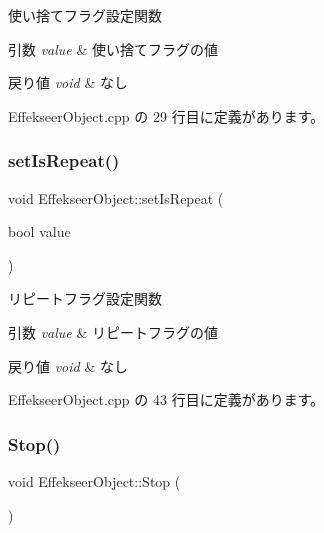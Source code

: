 使い捨てフラグ設定関数 


\begin{DoxyParams}{引数}
{\em value} & 使い捨てフラグの値 \\
\hline
\end{DoxyParams}

\begin{DoxyRetVals}{戻り値}
{\em void} & なし \\
\hline
\end{DoxyRetVals}


 Effekseer\+Object.\+cpp の 29 行目に定義があります。

\mbox{\label{class_effekseer_object_a5a321097534dd21b16862f56f66e730b}} 
\subsubsection{\texorpdfstring{set\+Is\+Repeat()}{setIsRepeat()}}
{\footnotesize\ttfamily void Effekseer\+Object\+::set\+Is\+Repeat (\begin{DoxyParamCaption}\item[{bool}]{value }\end{DoxyParamCaption})}



リピートフラグ設定関数 


\begin{DoxyParams}{引数}
{\em value} & リピートフラグの値 \\
\hline
\end{DoxyParams}

\begin{DoxyRetVals}{戻り値}
{\em void} & なし \\
\hline
\end{DoxyRetVals}


 Effekseer\+Object.\+cpp の 43 行目に定義があります。

\mbox{\label{class_effekseer_object_adfbdfbe202b78441b33d76656453e536}} 
\subsubsection{\texorpdfstring{Stop()}{Stop()}}
{\footnotesize\ttfamily void Effekseer\+Object\+::\+Stop (\begin{DoxyParamCaption}{ }\end{DoxyParamCaption})}




